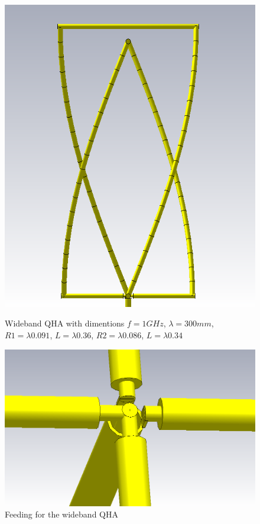 \begin{figure}[H]
  \centering
  \begin{minipage}[b]{0.5\textwidth}
    \includegraphics[scale = 0.3]{figures/antennas/qha/wideband}
    \caption{Wideband QHA with dimentions $f = 1GHz$, $\lambda = 300mm$, $R1 = \lambda 0.091$, $ L = \lambda 0.36$, $R2 = \lambda 0.086$, $ L = \lambda 0.34$}
    \label{fig:WB_QHA}
  \end{minipage}
  \hfill
  \begin{minipage}[b]{0.4\textwidth}
	\includegraphics[scale = 0.3]{figures/antennas/qha/wideband_feeding}
    \caption{Feeding for the wideband QHA}
    \label{fig:WB_QHA_feed}
  \end{minipage}
\end{figure}


